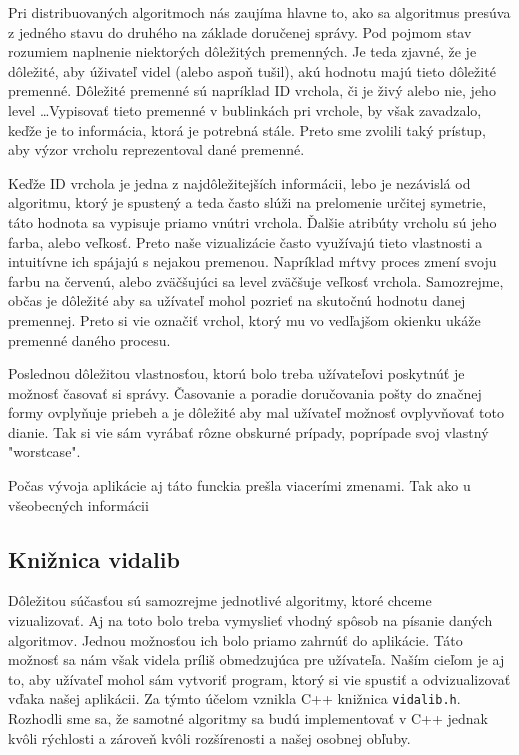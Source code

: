 Pri distribuovaných algoritmoch nás zaujíma hlavne to, ako sa algoritmus presúva z jedného stavu do
druhého na základe doručenej správy. Pod pojmom stav rozumiem naplnenie niektorých dôležitých
premenných. Je teda zjavné, že je dôležité, aby úživateľ videl (alebo aspoň tušil), akú hodnotu majú
tieto dôležité premenné. Dôležité premenné sú napríklad ID vrchola, či je živý alebo nie, jeho
level \dots Vypisovať tieto premenné v bublinkách pri vrchole, by však zavadzalo, keďže je to
informácia, ktorá je potrebná stále. Preto sme zvolili taký prístup, aby výzor vrcholu reprezentoval
dané premenné.

Keďže ID vrchola je jedna z najdôležitejších informácii, lebo je nezávislá od algoritmu, ktorý je
spustený a teda často slúži na prelomenie určitej symetrie, táto hodnota sa vypisuje priamo vnútri
vrchola. Ďalšie atribúty vrcholu sú jeho farba, alebo veľkosť. Preto naše vizualizácie často
využívajú tieto vlastnosti a intuitívne ich spájajú s nejakou premenou. Napríklad mŕtvy proces zmení
svoju farbu na červenú, alebo zväčšujúci sa level zväčšuje veľkosť vrchola.
Samozrejme, občas je dôležité aby sa užívateľ mohol pozrieť na skutočnú hodnotu danej premennej.
Preto si vie označiť vrchol, ktorý mu vo vedľajšom okienku ukáže premenné daného procesu.

Poslednou dôležitou vlastnosťou, ktorú bolo treba užívateľovi poskytnúť je možnosť časovať si
správy. Časovanie a poradie doručovania pošty do značnej formy ovplyňuje priebeh a je dôležité aby
mal užívateľ možnosť ovplyvňovať toto dianie. Tak si vie sám vyrábať rôzne obskurné prípady,
poprípade svoj vlastný "worstcase".

Počas vývoja aplikácie aj táto funckia prešla viacerími zmenami. Tak ako u všeobecných informácii

\subsection{Knižnica vidalib}

Dôležitou súčasťou sú samozrejme jednotlivé algoritmy, ktoré chceme vizualizovať. Aj na toto bolo
treba vymyslieť vhodný spôsob na písanie daných algoritmov. Jednou možnosťou ich bolo priamo zahrnúť
do aplikácie. Táto možnosť sa nám však videla príliš obmedzujúca pre užívateľa. Naším cieľom je aj
to, aby užívateľ mohol sám vytvoriť program, ktorý si vie spustiť a odvizualizovať vďaka našej
aplikácii. Za týmto účelom vznikla C++ knižnica \verb!vidalib.h!. Rozhodli sme sa, že samotné
algoritmy sa budú implementovať v C++ jednak kvôli rýchlosti a zároveň kvôli rozšírenosti a našej
osobnej obľuby.

